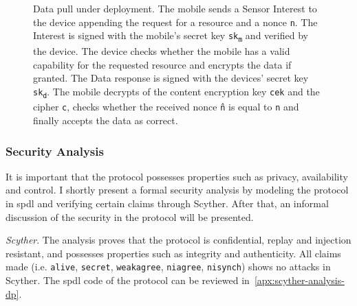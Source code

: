\begin{figure}[ht]
  \caption[Data pull under deployment]{Data pull under deployment. 
  The mobile sends a Sensor Interest to the device appending the request for a resource and a nonce \texttt{n}. 
  The Interest is signed with the mobile's secret key \texttt{sk\textsubscript{m}} and verified by the device. 
  The device checks whether the mobile has a valid capability for the requested resource and encrypts the data if granted.
  The Data response is signed with the devices' secret key \texttt{sk\textsubscript{d}}.
  The mobile decrypts of the content encryption key \texttt{cek} and the cipher \texttt{c}, checks whether the received nonce \texttt{\^{n}} is equal to \texttt{n} and finally accepts the data as correct.}
  \label{fig:data_pull_ibe}
\end{figure}


\subsubsection{Security Analysis}
It is important that the protocol possesses properties such as privacy, availability and control. 
I shortly present a formal security analysis by modeling the protocol in \gls{spdl} and verifying certain claims through Scyther.
After that, an informal discussion of the security in the protocol will be presented.

\textit{Scyther}.
The analysis proves that the protocol is confidential, replay and injection resistant, and possesses properties such as integrity and authenticity.
All claims made (i.e. \texttt{alive}, \texttt{secret}, \texttt{weakagree}, \texttt{niagree}, \texttt{nisynch}) shows no attacks in Scyther. 
The \gls{spdl} code of the protocol can be reviewed in~\autoref{apx:scyther-analysis-dp}.

